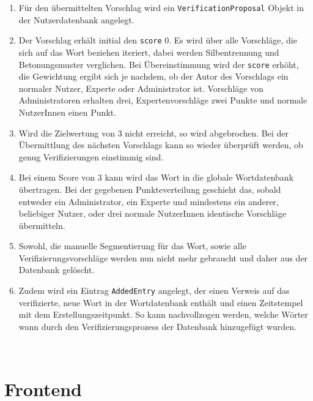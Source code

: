 \begin{enumerate}
	\item Für den übermittelten Vorschlag wird ein \texttt{VerificationProposal} Objekt in der Nutzerdatenbank angelegt.
	
	\item Der Vorschlag erhält initial den \texttt{score} $0$. Es wird über alle Vorschläge, die sich auf das Wort beziehen iteriert, dabei werden Silbentrennung und Betonungsmuster verglichen. Bei Übereinstimmung wird der \texttt{score} erhöht, die Gewichtung ergibt sich je nachdem, ob der Autor des Vorschlags ein normaler Nutzer, Experte oder Administrator ist. Vorschläge von Administratoren erhalten drei, Expertenvorschläge zwei Punkte und normale NutzerInnen einen Punkt.
	
	\item Wird die Zielwertung von $3$ nicht erreicht, so wird abgebrochen. Bei der Übermittlung des nächsten Vorschlags kann so wieder überprüft werden, ob genug Verifizierungen einstimmig sind.
	
	\item Bei einem Score von $3$ kann wird das Wort in die globale Wortdatenbank übertragen. Bei der gegebenen Punkteverteilung geschieht das, sobald entweder ein Administrator, ein Experte und mindestens ein anderer, beliebiger Nutzer, oder drei normale NutzerInnen identische Vorschläge übermitteln.
	
	\item Sowohl, die manuelle Segmentierung für das Wort, sowie alle Verifizierungsvorschläge werden nun nicht mehr gebraucht und daher aus der Datenbank gelöscht.
	
	\item Zudem wird ein Eintrag \texttt{AddedEntry} angelegt, der einen Verweis auf das verifizierte, neue Wort in der Wortdatenbank enthält und einen Zeitstempel mit dem Erstellungszeitpunkt. So kann nachvollzogen werden, welche Wörter wann durch den Verifizierungsprozess der Datenbank hinzugefügt wurden.
\end{enumerate}

\\










\section{Frontend}

